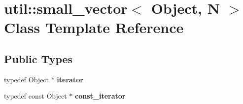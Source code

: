 \hypertarget{classutil_1_1small__vector}{\section{util\+:\+:small\+\_\+vector$<$ Object, N $>$ Class Template Reference}
\label{classutil_1_1small__vector}
}
\subsection*{Public Types}
\begin{DoxyCompactItemize}
\item 
\hypertarget{classutil_1_1small__vector_ad4f55aafd11191c45c6b5f0cb468d223}{typedef Object $\ast$ {\bfseries iterator}}\label{classutil_1_1small__vector_ad4f55aafd11191c45c6b5f0cb468d223}

\item 
\hypertarget{classutil_1_1small__vector_a7a290fb7062ac2f564f8ef577ee79acb}{typedef const Object $\ast$ {\bfseries const\+\_\+iterator}}\label{classutil_1_1small__vector_a7a290fb7062ac2f564f8ef577ee79acb}

\end{DoxyCompactItemize}
